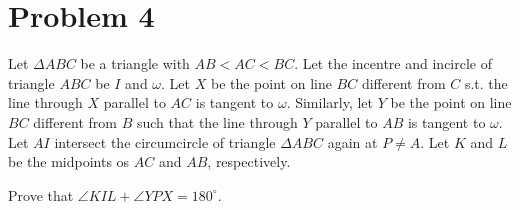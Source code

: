 \documentclass{Math_Note}
\begin{document}
\section*{Problem 4}
\begin{prb}
    Let $\Delta ABC$ be a triangle with $AB<AC<BC$. Let the incentre and incircle of triangle $ABC$ be $I$ and $\omega$. Let $X$ be the point on line $BC$ different from $C$ 
    s.t. the line through $X$ parallel to $AC$ is tangent to $\omega$. Similarly, let $Y$ be the point on line $BC$ different from $B$ such that the line through $Y$ parallel 
    to $AB$ is tangent to $\omega$. Let $AI$ intersect the circumcircle of triangle $\Delta ABC$ again at $P \neq A$. Let $K$ and $L$ be the midpoints os $AC$ and $AB$, respectively.

    Prove that $\angle KIL + \angle YPX = 180^{\circ}$. 
\end{prb}
\end{document}
